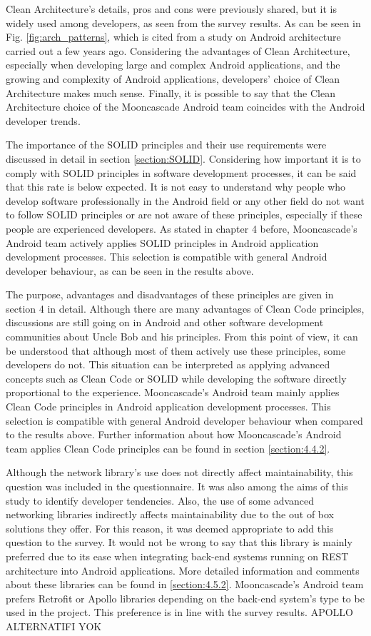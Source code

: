 Clean Architecture's details, pros and cons were previously shared, but it is widely used among developers, as seen from the survey results. As can be seen in Fig. \ref{fig:arch_patterns}, which is cited from a study on Android architecture carried out a few years ago. Considering the advantages of Clean Architecture, especially when developing large and complex Android applications, and the growing and complexity of Android applications, developers' choice of Clean Architecture makes much sense. Finally, it is possible to say that the Clean Architecture choice of the Mooncascade Android team coincides with the Android developer trends.

The importance of the SOLID principles and their use requirements were discussed in detail in section \ref{section:SOLID}. Considering how important it is to comply with SOLID principles in software development processes, it can be said that this rate is below expected. It is not easy to understand why people who develop software professionally in the Android field or any other field do not want to follow SOLID principles or are not aware of these principles, especially if these people are experienced developers. As stated in chapter 4 before, Mooncascade's Android team actively applies SOLID principles in Android application development processes. This selection is compatible with general Android developer behaviour, as can be seen in the results above.


The purpose, advantages and disadvantages of these principles are given in section 4 in detail. 
Although there are many advantages of Clean Code principles, discussions are still going on in Android and other software development communities about Uncle Bob and his principles. From this point of view, it can be understood that although most of them actively use these principles, some developers do not. This situation can be interpreted as applying advanced concepts such as Clean Code or SOLID while developing the software directly proportional to the experience. Mooncascade's Android team mainly applies Clean Code principles in Android application development processes. This selection is compatible with general Android developer behaviour when compared to the results above. Further information about how Mooncascade's Android team applies Clean Code principles can be found in section \ref{section:4.4.2}.

Although the network library's use does not directly affect maintainability, this question was included in the questionnaire. It was also among the aims of this study to identify developer tendencies. Also, the use of some advanced networking libraries indirectly affects maintainability due to the out of box solutions they offer. For this reason, it was deemed appropriate to add this question to the survey. 
It would not be wrong to say that this library is mainly preferred due to its ease when integrating back-end systems running on REST architecture into Android applications. More detailed information and comments about these libraries can be found in \ref{section:4.5.2}. Mooncascade's Android team prefers Retrofit or Apollo libraries depending on the back-end system’s type to be used in the project. This preference is in line with the survey results. APOLLO ALTERNATIFI YOK

